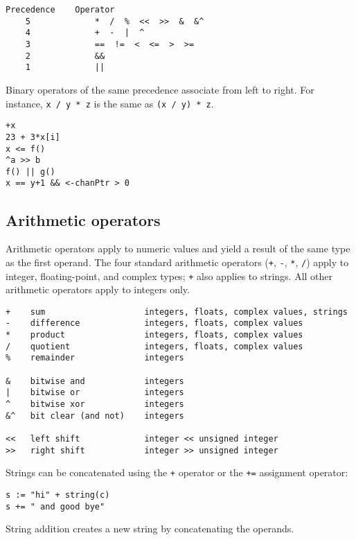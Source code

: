 \begin{Verbatim}[frame=single]
Precedence    Operator
    5             *  /  %  <<  >>  &  &^
    4             +  -  |  ^
    3             ==  !=  <  <=  >  >=
    2             &&
    1             ||
\end{Verbatim}

Binary operators of the same precedence associate from left to right.
For instance, \texttt{x / y * z} is the same as \texttt{(x / y) * z}.

\begin{Verbatim}[frame=single]
+x
23 + 3*x[i]
x <= f()
^a >> b
f() || g()
x == y+1 && <-chanPtr > 0
\end{Verbatim}

\subsection*{Arithmetic operators}

Arithmetic operators apply to numeric values and yield a result of the
same type as the first operand. The four standard arithmetic operators
(\texttt{+}, \texttt{-}, \texttt{*}, \texttt{/}) apply to integer,
floating-point, and complex types; \texttt{+} also applies to strings.
All other arithmetic operators apply to integers only.

\begin{Verbatim}[frame=single]
+    sum                    integers, floats, complex values, strings
-    difference             integers, floats, complex values
*    product                integers, floats, complex values
/    quotient               integers, floats, complex values
%    remainder              integers

&    bitwise and            integers
|    bitwise or             integers
^    bitwise xor            integers
&^   bit clear (and not)    integers

<<   left shift             integer << unsigned integer
>>   right shift            integer >> unsigned integer
\end{Verbatim}

Strings can be concatenated using the \texttt{+} operator or the
\texttt{+=} assignment operator:

\begin{Verbatim}[frame=single]
s := "hi" + string(c)
s += " and good bye"
\end{Verbatim}

String addition creates a new string by concatenating the operands.

